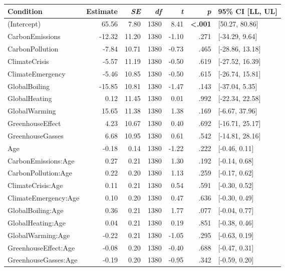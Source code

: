 \begin{table}[ht]
\centering
\begin{tabular}{lrrrrrl}
  \hline
Condition & Estimate & \textit{SE} & \textit{df} & \textit{t} & \textit{p} & 95\% CI [LL, UL] \\ 
  \hline
(Intercept) & 65.56 & 7.80 & 1380 & 8.41 & \textbf{\textless  .001} & [50.27, 80.86] \\ 
  CarbonEmissions & -12.32 & 11.20 & 1380 & -1.10 & .271 & [-34.29, 9.64] \\ 
  CarbonPollution & -7.84 & 10.71 & 1380 & -0.73 & .465 & [-28.86, 13.18] \\ 
  ClimateCrisis & -5.57 & 11.19 & 1380 & -0.50 & .619 & [-27.52, 16.39] \\ 
  ClimateEmergency & -5.46 & 10.85 & 1380 & -0.50 & .615 & [-26.74, 15.81] \\ 
  GlobalBoiling & -15.85 & 10.81 & 1380 & -1.47 & .143 & [-37.04, 5.35] \\ 
  GlobalHeating & 0.12 & 11.45 & 1380 & 0.01 & .992 & [-22.34, 22.58] \\ 
  GlobalWarming & 15.65 & 11.38 & 1380 & 1.38 & .169 & [-6.67, 37.96] \\ 
  GreenhouseEffect & 4.23 & 10.67 & 1380 & 0.40 & .692 & [-16.71, 25.17] \\ 
  GreenhouseGasses & 6.68 & 10.95 & 1380 & 0.61 & .542 & [-14.81, 28.16] \\ 
  Age & -0.18 & 0.14 & 1380 & -1.22 & .222 & [-0.46, 0.11] \\ 
  CarbonEmissions:Age & 0.27 & 0.21 & 1380 & 1.30 & .192 & [-0.14, 0.68] \\ 
  CarbonPollution:Age & 0.22 & 0.20 & 1380 & 1.13 & .259 & [-0.17, 0.62] \\ 
  ClimateCrisis:Age & 0.11 & 0.21 & 1380 & 0.54 & .591 & [-0.30, 0.52] \\ 
  ClimateEmergency:Age & 0.10 & 0.20 & 1380 & 0.47 & .636 & [-0.30, 0.49] \\ 
  GlobalBoiling:Age & 0.36 & 0.21 & 1380 & 1.77 & .077 & [-0.04, 0.77] \\ 
  GlobalHeating:Age & 0.04 & 0.21 & 1380 & 0.19 & .851 & [-0.38, 0.46] \\ 
  GlobalWarming:Age & -0.22 & 0.21 & 1380 & -1.05 & .295 & [-0.63, 0.19] \\ 
  GreenhouseEffect:Age & -0.08 & 0.20 & 1380 & -0.40 & .688 & [-0.47, 0.31] \\ 
  GreenhouseGasses:Age & -0.19 & 0.20 & 1380 & -0.95 & .342 & [-0.59, 0.20] \\ 
   \hline
\end{tabular}
\end{table}

